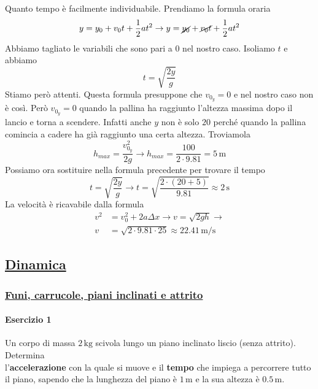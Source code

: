 Quanto tempo è facilmente individuabile. Prendiamo la formula oraria
\begin{equation*}
y = y_0 + v_0t+\frac{1}{2}at^2 \rightarrow y = \cancel{y_0}+\cancel{v_0t}+\frac{1}{2}at^2
\end{equation*}
Abbiamo tagliato le variabili che sono pari a $0$ nel nostro caso. Isoliamo $t$ e abbiamo
\begin{equation*}
t = \sqrt{\frac{2y}{g}}
\end{equation*}
Stiamo però attenti. Questa formula presuppone che $v_{0_y} = 0$ e nel nostro caso non è così. Però
$v_{0_y} = 0$ quando la pallina ha raggiunto l'altezza massima dopo il lancio e torna a scendere.
Infatti anche $y$ non è solo $20$ perché quando la pallina comincia a cadere ha già raggiunto una 
certa altezza. Troviamola
\begin{equation*}
h_{max} = \frac{v_{0_y}^2}{2g} \rightarrow h_{max} = \frac{100}{2\cdot9.81} = 5\,\text{m}
\end{equation*}
Possiamo ora sostituire nella formula precedente per trovare il tempo
\begin{equation*}
t = \sqrt{\frac{2y}{g}} \rightarrow t = \sqrt{\frac{2\cdot(20+5)}{9.81}} \approx\boxed{2\,\text{s}}
\end{equation*}
La velocità è ricavabile dalla formula
\begin{align*}
v^2 &= v_0^2 + 2a\Delta x \rightarrow v = \sqrt{2gh} \rightarrow\\
v &= \sqrt{2\cdot9.81\cdot25}\approx
\boxed{22.41\,\text{m/s}}
\end{align*}

\subsection*{\hyperref[sec:dinamica]{Dinamica}}\label{ex:dinamica}
\subsubsection*{\hyperref[subsec:dinamica:piano]{Funi, carrucole, piani inclinati e attrito}}
\label{ex:dinamica:piano}
\paragraph{Esercizio 1}
Un corpo di massa $2\,\text{kg}$ scivola lungo un piano inclinato liscio (senza attrito). Determina \\
l'\textbf{accelerazione} con la quale si muove e il \textbf{tempo} che impiega a percorrere tutto il
piano, sapendo che la lunghezza del piano è $1\,\text{m}$ e la sua altezza è $0.5\,\text{m}$.
\divisor

